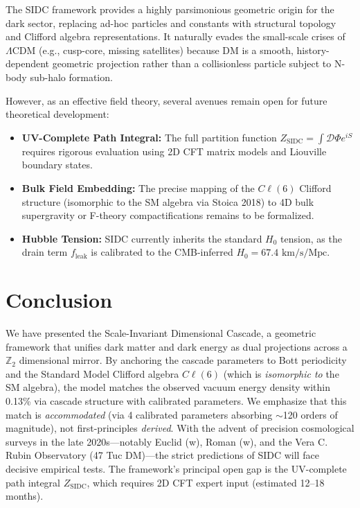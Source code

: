 \documentclass[12pt, a4paper]{article}
\begin{document}
The SIDC framework provides a highly parsimonious geometric origin for the dark sector, replacing ad-hoc particles and constants with structural topology and Clifford algebra representations. It naturally evades the small-scale crises of $\Lambda$CDM (e.g., cusp-core, missing satellites) because DM is a smooth, history-dependent geometric projection rather than a collisionless particle subject to N-body sub-halo formation.

However, as an effective field theory, several avenues remain open for future theoretical development:
\begin{itemize}
    \item \textbf{UV-Complete Path Integral:} The full partition function $Z_{\text{SIDC}} = \int \mathcal{D}\Phi e^{iS}$ requires rigorous evaluation using 2D CFT matrix models and Liouville boundary states.
    \item \textbf{Bulk Field Embedding:} The precise mapping of the $C\ell(6)$ Clifford structure (isomorphic to the SM algebra via Stoica 2018) to 4D bulk supergravity or F-theory compactifications remains to be formalized.
    \item \textbf{Hubble Tension:} SIDC currently inherits the standard $H_0$ tension, as the drain term $f_{\text{leak}}$ is calibrated to the CMB-inferred $H_0 = 67.4 \text{ km/s/Mpc}$.
\end{itemize}

\section{Conclusion}
We have presented the Scale-Invariant Dimensional Cascade, a geometric framework that unifies dark matter and dark energy as dual projections across a $\mathbb{Z}_{2}$ dimensional mirror. By anchoring the cascade parameters to Bott periodicity and the Standard Model Clifford algebra $C\ell(6)$ (which is \textit{isomorphic to} the SM algebra), the model matches the observed vacuum energy density within 0.13\% via cascade structure with calibrated parameters. We emphasize that this match is \textit{accommodated} (via 4 calibrated parameters absorbing $\sim$120 orders of magnitude), not first-principles \textit{derived}. With the advent of precision cosmological surveys in the late 2020s---notably Euclid (w), Roman (w), and the Vera C. Rubin Observatory (47 Tuc DM)---the strict predictions of SIDC will face decisive empirical tests. The framework's principal open gap is the UV-complete path integral $Z_{\text{SIDC}}$, which requires 2D CFT expert input (estimated 12--18 months).
\end{document}
